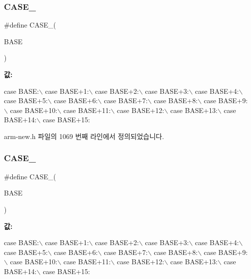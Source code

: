 \mbox{\label{arm-new_8h_a7dc7875774844a4717dfa1e8ecbc069c}} 
\subsubsection{\texorpdfstring{C\+A\+S\+E\+\_}{CASE\_16}\hspace{0.1cm}{\footnotesize\ttfamily [1/2]}}
{\footnotesize\ttfamily \#define C\+A\+S\+E\+\_(\begin{DoxyParamCaption}\item[{}]{B\+A\+SE }\end{DoxyParamCaption})}

{\bfseries 값\+:}
\begin{DoxyCode}
\textcolor{keywordflow}{case} BASE:\(\backslash\)
  case BASE+1:\(\backslash\)
  case BASE+2:\(\backslash\)
  case BASE+3:\(\backslash\)
  case BASE+4:\(\backslash\)
  case BASE+5:\(\backslash\)
  case BASE+6:\(\backslash\)
  case BASE+7:\(\backslash\)
  case BASE+8:\(\backslash\)
  case BASE+9:\(\backslash\)
  case BASE+10:\(\backslash\)
  case BASE+11:\(\backslash\)
  case BASE+12:\(\backslash\)
  case BASE+13:\(\backslash\)
  case BASE+14:\(\backslash\)
  case BASE+15:
\end{DoxyCode}


arm-\/new.\+h 파일의 1069 번째 라인에서 정의되었습니다.

\mbox{\label{_g_b_a_8cpp_a7dc7875774844a4717dfa1e8ecbc069c}} 
\subsubsection{\texorpdfstring{C\+A\+S\+E\+\_}{CASE\_16}\hspace{0.1cm}{\footnotesize\ttfamily [2/2]}}
{\footnotesize\ttfamily \#define C\+A\+S\+E\+\_(\begin{DoxyParamCaption}\item[{}]{B\+A\+SE }\end{DoxyParamCaption})}

{\bfseries 값\+:}
\begin{DoxyCode}
\textcolor{keywordflow}{case} BASE:\(\backslash\)
  case BASE+1:\(\backslash\)
  case BASE+2:\(\backslash\)
  case BASE+3:\(\backslash\)
  case BASE+4:\(\backslash\)
  case BASE+5:\(\backslash\)
  case BASE+6:\(\backslash\)
  case BASE+7:\(\backslash\)
  case BASE+8:\(\backslash\)
  case BASE+9:\(\backslash\)
  case BASE+10:\(\backslash\)
  case BASE+11:\(\backslash\)
  case BASE+12:\(\backslash\)
  case BASE+13:\(\backslash\)
  case BASE+14:\(\backslash\)
  case BASE+15:
\end{DoxyCode}
\mbox{\label{arm-new_8h_a47d620846f3e6737dd5142ab2b9f726c}} 
